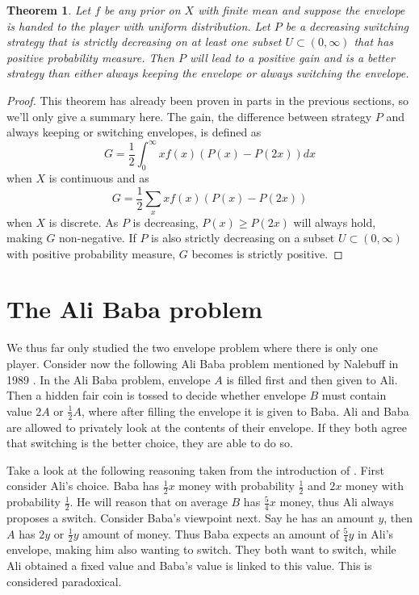 \documentclass[a4paper]{report}
\theoremstyle{plain}
\newtheorem{theorem}{Theorem}[section]
\theoremstyle{definition}
\theoremstyle{remark}
\numberwithin{equation}{chapter}
\DeclareMathOperator{\1}{\mathbbm{1}}
\begin{document}
\begin{theorem}\label{thm:switchall}
Let $f$ be any prior on $X$ with finite mean and suppose the envelope is handed to the player with uniform distribution. Let $P$ be a decreasing switching strategy that is strictly decreasing on at least one subset $U\subset(0,\infty)$ that has positive probability measure. Then $P$ will lead to a positive gain and is a better strategy than either always keeping the envelope or always switching the envelope.
\end{theorem}
\begin{proof}
This theorem has already been proven in parts in the previous sections, so we'll only give a summary here. The gain, the difference between strategy $P$ and always keeping or switching envelopes, is defined as
\begin{equation}
G=\frac{1}{2}\int_0^\infty xf(x)(P(x)-P(2x))dx
\end{equation}
when $X$ is continuous and as
\begin{equation}
G=\frac{1}{2}\sum_xxf(x)(P(x)-P(2x))
\end{equation}
when $X$ is discrete. As $P$ is decreasing, $P(x)\geq P(2x)$ will always hold, making $G$ non-negative. If $P$ is also strictly decreasing on a subset $U\subset(0,\infty)$ with positive probability measure, $G$ becomes is strictly positive.
\end{proof}

\section{The Ali Baba problem}\label{sec:EnvelopeAli}
We thus far only studied the two envelope problem where there is only one player. Consider now the following Ali Baba problem mentioned by Nalebuff in 1989 \cite{Nalebuff89}. In the Ali Baba problem, envelope $A$ is filled first and then given to Ali. Then a hidden fair coin is tossed to decide whether envelope $B$ must contain value $2A$ or $\frac{1}{2}A$, where after filling the envelope it is given to Baba. Ali and Baba are allowed to privately look at the contents of their envelope. If they both agree that switching is the better choice, they are able to do so.

Take a look at the following reasoning taken from the introduction of \cite{Nalebuff89}. First consider Ali's choice. Baba has $\frac{1}{2}x$ money with probability $\frac{1}{2}$ and $2x$ money with probability $\frac{1}{2}$. He will reason that on average $B$ has $\frac{5}{4}x$ money, thus Ali always proposes a switch. Consider Baba's viewpoint next. Say he has an amount $y$, then $A$ has $2y$ or $\frac{1}{2}y$ amount of money. Thus Baba expects an amount of $\frac{5}{4}y$ in Ali's envelope, making him also wanting to switch. They both want to switch, while Ali obtained a fixed value and Baba's value is linked to this value. This is considered paradoxical.
\end{document}
